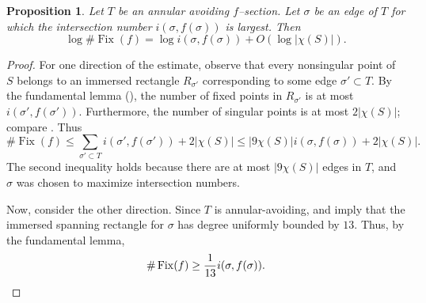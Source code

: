\documentclass[11pt,letterpaper]{amsart}
\newcommand{\Fix}{\operatorname{Fix}}
\numberwithin{equation}{section}
\newtheorem{proposition}[theorem]{Proposition}
\theoremstyle{definition}
\newcommand{\dave}[1]{{\color{darkgreen}{#1}}}
\begin{document}
%    
%    
%    
\begin{proposition}\label{Prop:EdgeToFixedPoints}
Let $T$ be an annular avoiding $f$--section. Let $\sigma$ be an edge of $T$ for which the intersection number $i(\sigma, f(\sigma))$ is largest. Then
\[
 \log \# \Fix(f) = \log  i(\sigma, f(\sigma)) + O(\log |\chi(S)|).
\]
\end{proposition}

\begin{proof}
For one direction of the estimate, observe that every nonsingular point 
of $S$ belongs to an immersed rectangle $R_{\sigma'}$ corresponding to some edge $\sigma' \subset T$. By the fundamental lemma (), the number of fixed points in $R_{\sigma'}$ is at most $i(\sigma', f(\sigma'))$. Furthermore, the number of singular points is at most $2| \chi(S) |$; compare .
Thus
\[
\# \Fix(f) \leq \sum_{\sigma' \subset T} i(\sigma', f(\sigma')) + 2| \chi(S) |
\leq | 9 \chi(S) |  i(\sigma, f(\sigma)) + 2| \chi(S) |. 
\]
The second inequality holds because there are at most $| 9 \chi(S) |$ edges in $T$, and $\sigma$ was  chosen to maximize intersection numbers.

Now, consider the other direction. 
Since $T$ is annular-avoiding,  and  imply that the immersed spanning rectangle for $\sigma$ has degree uniformly bounded by $13$.
Thus, by the fundamental lemma, 
\[
 \# \Fix(f) \geq \frac{1}{13}  i(\sigma, f(\sigma)).
 \qedhere
\]
\end{proof}
\end{document}
